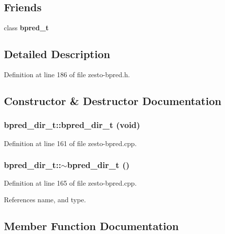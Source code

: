 \subsection*{Friends}
\begin{CompactItemize}
\item 
class {\bf bpred\_\-t}
\end{CompactItemize}


\subsection{Detailed Description}


Definition at line 186 of file zesto-bpred.h.

\subsection{Constructor \& Destructor Documentation}
\subsubsection[{bpred\_\-dir\_\-t}]{\setlength{\rightskip}{0pt plus 5cm}bpred\_\-dir\_\-t::bpred\_\-dir\_\-t (void)}\label{classbpred__dir__t_d966ab44f9a56a8c75f94da4df9ca01f}




Definition at line 161 of file zesto-bpred.cpp.
\subsubsection[{$\sim$bpred\_\-dir\_\-t}]{\setlength{\rightskip}{0pt plus 5cm}bpred\_\-dir\_\-t::$\sim$bpred\_\-dir\_\-t ()\hspace{0.3cm}{\tt  [virtual]}}\label{classbpred__dir__t_20e50d4272da7ce52cc2574610762be0}




Definition at line 165 of file zesto-bpred.cpp.

References name, and type.

\subsection{Member Function Documentation}
